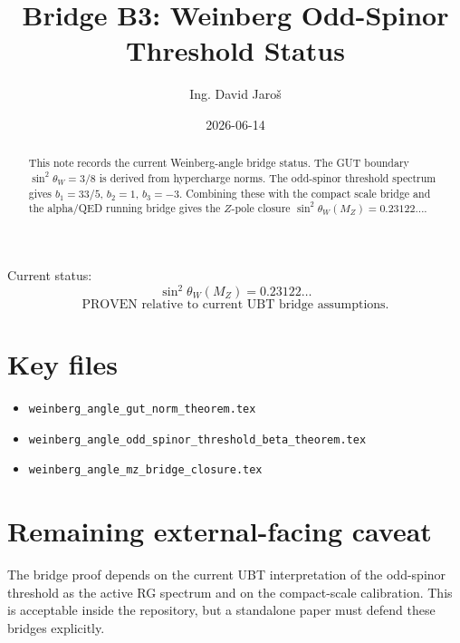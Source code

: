 \documentclass[12pt,a4paper]{article}
\title{Bridge B3: Weinberg Odd-Spinor Threshold Status}
\author{Ing. David Jaroš}
\date{2026-06-14}
\begin{document}
\maketitle

\begin{abstract}
This note records the current Weinberg-angle bridge status.  The GUT boundary
$\sin^2\theta_W=3/8$ is derived from hypercharge norms.  The odd-spinor
threshold spectrum gives $b_1=33/5$, $b_2=1$, $b_3=-3$.  Combining these with
the compact scale bridge and the alpha/QED running bridge gives the $Z$-pole
closure $\sin^2\theta_W(M_Z)=0.23122\ldots$.
\end{abstract}

\begin{statusbox}
Current status:
\[
  \sin^2\theta_W(M_Z)=0.23122\ldots
\]
\[
  \text{PROVEN relative to current UBT bridge assumptions.}
\]
\end{statusbox}

\section{Key files}

\begin{itemize}
  \item \texttt{weinberg\_angle\_gut\_norm\_theorem.tex}
  \item \texttt{weinberg\_angle\_odd\_spinor\_threshold\_beta\_theorem.tex}
  \item \texttt{weinberg\_angle\_mz\_bridge\_closure.tex}
\end{itemize}

\section{Remaining external-facing caveat}

The bridge proof depends on the current UBT interpretation of the odd-spinor
threshold as the active RG spectrum and on the compact-scale calibration.  This
is acceptable inside the repository, but a standalone paper must defend these
bridges explicitly.
\end{document}
